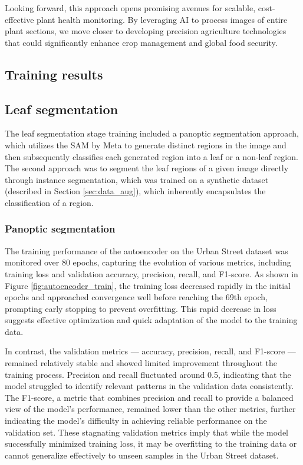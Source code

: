 \documentclass[draft,final]{vutinfth} %
\begin{document}
Looking forward, this approach opens promising avenues for scalable, cost-effective plant health monitoring. By leveraging AI to process images of entire plant sections, we move closer to developing precision agriculture technologies that could significantly enhance crop management and global food security.

\appendix
\begin{appendix}
\chapter{Training results}

\section{Leaf segmentation}
The leaf segmentation stage training included a panoptic segmentation approach, which utilizes the SAM by Meta to generate distinct regions in the image and then subsequently classifies each generated region into a leaf or a non-leaf region. The second approach was to segment the leaf regions of a given image directly through instance segmentation, which was trained on a synthetic dataset (described in Section \ref{sec:data_aug}), which inherently encapsulates the classification of a region.

\subsection{Panoptic segmentation} \label{sec:leaf_segmentation_panoptic_training}
The training performance of the autoencoder on the Urban Street dataset \cite{yang_urban_2023} was monitored over 80 epochs, capturing the evolution of various metrics, including training loss and validation accuracy, precision, recall, and F1-score. As shown in Figure \ref{fig:autoencoder_train}, the training loss decreased rapidly in the initial epochs and approached convergence well before reaching the 69th epoch, prompting early stopping to prevent overfitting. This rapid decrease in loss suggests effective optimization and quick adaptation of the model to the training data.

In contrast, the validation metrics — accuracy, precision, recall, and F1-score — remained relatively stable and showed limited improvement throughout the training process. Precision and recall fluctuated around 0.5, indicating that the model struggled to identify relevant patterns in the validation data consistently. The F1-score, a metric that combines precision and recall to provide a balanced view of the model’s performance, remained lower than the other metrics, further indicating the model’s difficulty in achieving reliable performance on the validation set. These stagnating validation metrics imply that while the model successfully minimized training loss, it may be overfitting to the training data or cannot generalize effectively to unseen samples in the Urban Street dataset.


\end{appendix}
\end{document}
